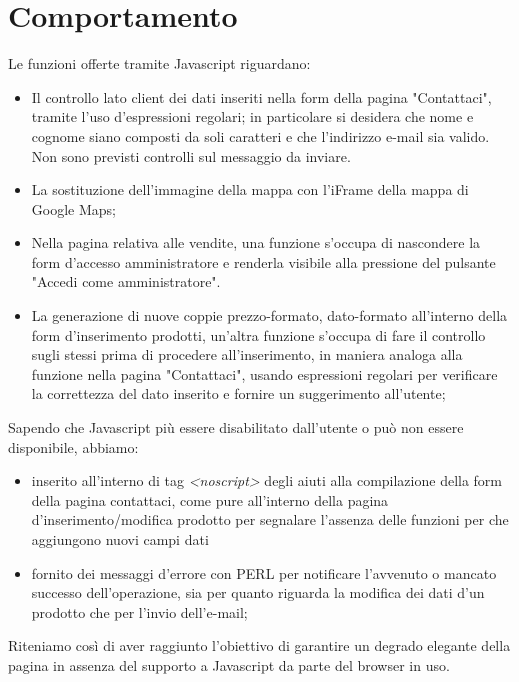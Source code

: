 \section{Comportamento}{
	Le funzioni offerte tramite Javascript riguardano: 
	\begin{itemize}\itemsep1pt
		\item Il controllo lato client dei dati inseriti nella form della pagina "Contattaci", tramite l'uso d'espressioni regolari; in particolare si desidera che nome e cognome siano composti da soli caratteri e che l'indirizzo e-mail sia valido. Non sono previsti controlli sul messaggio da inviare.
		\item La sostituzione dell'immagine della mappa con l'iFrame della mappa di Google Maps;
		\item Nella pagina relativa alle vendite, una funzione s'occupa di nascondere la form d'accesso amministratore e renderla visibile alla pressione del pulsante "Accedi come amministratore".
		\item La generazione di nuove coppie prezzo-formato, dato-formato all'interno della form d'inserimento prodotti, un'altra funzione s'occupa di fare il controllo sugli stessi prima di procedere all'inserimento, in maniera analoga alla funzione nella pagina "Contattaci", usando espressioni regolari per verificare la correttezza del dato inserito e fornire un suggerimento all'utente;
	\end{itemize}
	Sapendo che Javascript più essere disabilitato dall'utente o può non essere disponibile, abbiamo:
	\begin{itemize}\itemsep1pt
		\item inserito all'interno di tag \textit{<noscript>} degli aiuti alla compilazione della form della pagina contattaci, come pure all'interno della pagina d'inserimento/modifica prodotto per segnalare l'assenza delle funzioni per che aggiungono nuovi campi dati
		\item fornito dei messaggi d'errore con PERL per notificare l'avvenuto o mancato successo dell'operazione, sia per quanto riguarda la modifica dei dati d'un prodotto che per l'invio dell'e-mail;
	\end{itemize}
	Riteniamo così di aver raggiunto l'obiettivo di garantire un degrado elegante della pagina in assenza del supporto a Javascript da parte del browser in uso.
}